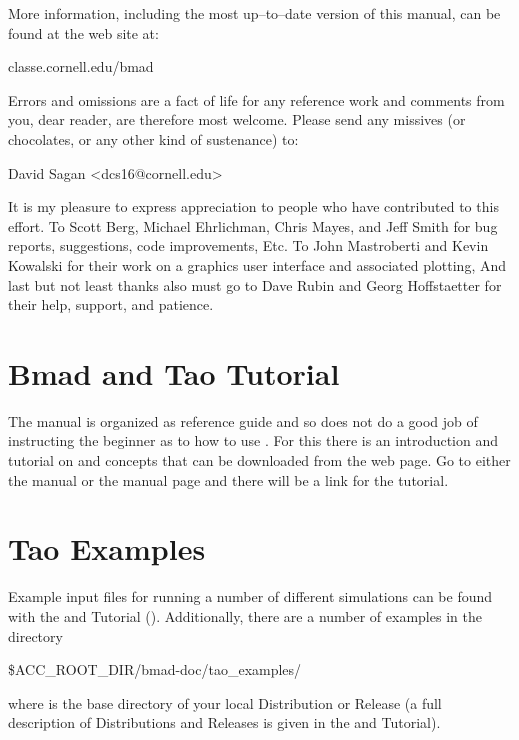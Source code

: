 More information, including the most up--to--date version of this manual, can be found at the \bmad
web site at:
\begin{example}
  classe.cornell.edu/bmad
\end{example}

Errors and omissions are a fact of life for any reference work and comments from you, dear reader,
are therefore most welcome. Please send any missives (or chocolates, or any other kind of
sustenance) to:
\begin{example}
  David Sagan <dcs16@cornell.edu>
\end{example}

It is my pleasure to express appreciation to people who have contributed to this effort. To Scott
Berg, Michael Ehrlichman, Chris Mayes, and Jeff Smith for bug reports, suggestions, code
improvements, Etc. To John Mastroberti and Kevin Kowalski for their work on a graphics user
interface and associated plotting, And last but not least thanks also must go to Dave Rubin and
Georg Hoffstaetter for their help, support, and patience.

\section{Bmad and Tao Tutorial}
\label{s:tutorial}

\vspace{0.1in} The \tao manual is organized as reference guide and so does not do a good job of
instructing the beginner as to how to use \tao. For this there is an introduction and tutorial on
\bmad and \tao concepts that can be downloaded from the \bmad web page. Go to either the \bmad
manual or the \tao manual page and there will be a link for the tutorial.

\section{Tao Examples}
\label{s:examples}

Example input files for running a number of different simulations can be found with the \bmad and \tao
Tutorial (). Additionally, there are a number of examples in the directory
\begin{example}
  \$ACC_ROOT_DIR/bmad-doc/tao_examples/
\end{example}
where  is the base directory of your local \bmad Distribution or Release (a full
description of \bmad Distributions and Releases is given in the \bmad and \tao Tutorial).

